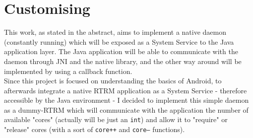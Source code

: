 \section{Customising}
\label{Customising}
This work, as stated in the abstract, aims to implement a native daemon (constantly running) which will be exposed as a System Service to the Java application layer. The Java application will be able to communicate with the daemon through JNI and the native library, and the other way around will be implemented by using a callback function.\\
Since this project is focused on understanding the basics of Android, to afterwards integrate a native RTRM application as a System Service - therefore accessible by the Java environment - I decided to implement this simple daemon as a dummy-RTRM which will communicate with the application the number of available "cores" (actually will be just an \texttt{int}) and allow it to "require" or "release" cores (with a sort of \texttt{core++} and \texttt{core--} functions).
